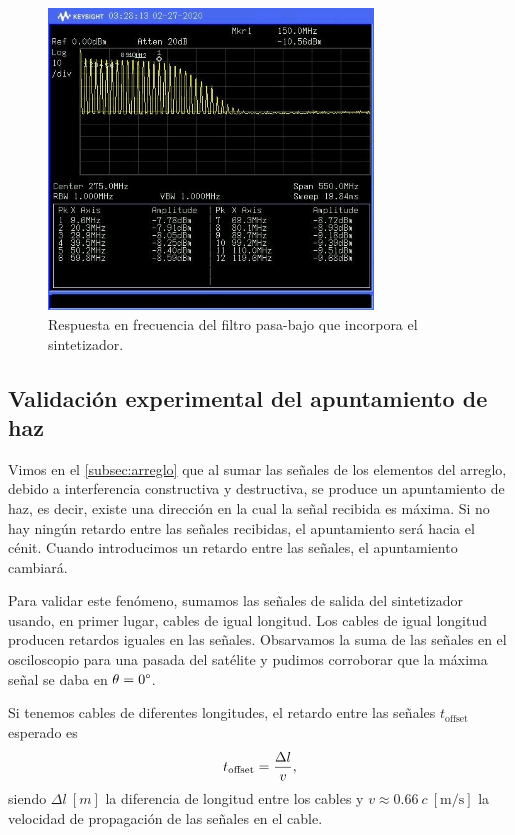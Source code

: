 \documentclass{article}
\newenvironment{standalone}{\begin{preview}}{\end{preview}}
\begin{document}
\begin{standalone}
  \begin{figure}[!htbp]
    \centering
    \includegraphics[width=\linewidth, height=80mm, keepaspectratio]{../images/filtro-dds.jpg}
    \caption{Respuesta en frecuencia del filtro pasa-bajo que incorpora el sintetizador.}
    \label{fig:filtro-dds}
  \end{figure}

  \subsection{Validación experimental del apuntamiento de haz}

  Vimos en el \cref{subsec:arreglo} que al sumar las señales de los elementos del arreglo, debido a interferencia constructiva y destructiva, se produce un apuntamiento de haz, es decir, existe una dirección en la cual la señal recibida es máxima.
  Si no hay ningún retardo entre las señales recibidas, el apuntamiento será hacia el cénit.
  Cuando introducimos un retardo entre las señales, el apuntamiento cambiará.

  Para validar este fenómeno, sumamos las señales de salida del sintetizador usando, en primer lugar, cables de igual longitud.
  Los cables de igual longitud producen retardos iguales en las señales.
  Obsarvamos la suma de las señales en el osciloscopio para una pasada del satélite y pudimos corroborar que la máxima señal se daba en $\theta = 0\degree$.


  Si tenemos cables de diferentes longitudes, el retardo entre las señales $t_{\text{offset}}$ esperado es
  \begin{equation}
    t_{\text{offset}} = \frac{\Delta l}{v},
    \tagaddtext{[\si{\second}]}
  \end{equation}
  siendo $\Delta l \ [\si{m}]$ la diferencia de longitud entre los cables y $v \approx 0.66 \ c\ [\si{\meter\per\second}]$ la velocidad de propagación de las señales en el cable.


\end{standalone}
\end{document}
